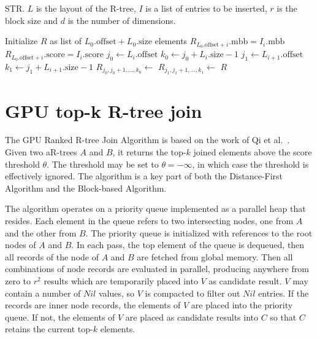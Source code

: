 \begin{algorithm}
  \caption{STR. \(L\) is the layout of the R-tree, \(I\) is a list of entries to be inserted, \(r\) is the block size and \(d\) is the number of dimensions.}
  \label{alg/str}
  \begin{algorithmic}[1]
      \State Initialize \(R\) as list of \(L_0.\mathrm{offset} + L_0.\mathrm{size}\) elements
        \State \(R_{L_0.\mathrm{offset} + i}.\mathrm{mbb} = I_i.\mathrm{mbb}\)
        \State \(R_{L_0.\mathrm{offset} + i}.\mathrm{score} = I_i.\mathrm{score}\)
      \EndFor
        \State \(j_0 \gets L_i.\mathrm{offset}\)
        \State \(k_0 \gets j_0 + L_i.\mathrm{size} - 1\)
        \State \(j_1 \gets L_{i + 1}.\mathrm{offset}\)
        \State \(k_1 \gets j_1 + L_{i + 1}.\mathrm{size} - 1\)
        \State \(R_{j_0, j_0 + 1, \dotsc, k_0} \gets\) 
        \State \(R_{j_1, j_1 + 1, \dotsc, k_1} \gets\) 
      \EndFor
      \State \Return \(R\)
    \EndFunction
  \end{algorithmic}
\end{algorithm}

\section{GPU top-k R-tree join}

The GPU Ranked R-tree Join Algorithm is based on the work of Qi et al.~\cite{qi2013efficient}. Given two aR-trees \(A\) and \(B\), it returns the top-\(k\) joined elements above the score threshold \(\theta\). The threshold may be set to \(\theta = -\infty\), in which case the threshold is effectively ignored. The algorithm is a key part of both the Distance-First Algorithm and the Block-based Algorithm.

The algorithm operates on a priority queue implemented as a parallel heap that resides. Each element in the queue refers to two intersecting nodes, one from \(A\) and the other from \(B\). The priority queue is initialized with references to the root nodes of \(A\) and \(B\). In each pass, the top element of the queue is dequeued, then all records of the node of \(A\) and \(B\) are fetched from global memory. Then all combinations of node records are evaluated in parallel, producing anywhere from zero to \(r^2\) results which are temporarily placed into \(V\) as candidate result. \(V\) may contain a number of \(Nil\) values, so \(V\) is compacted to filter out \(Nil\) entries. If the records are inner node records, the elements of \(V\) are placed into the priority queue. If not, the elements of \(V\) are placed as candidate results into \(C\) so that \(C\) retains the current top-\(k\) elements.

